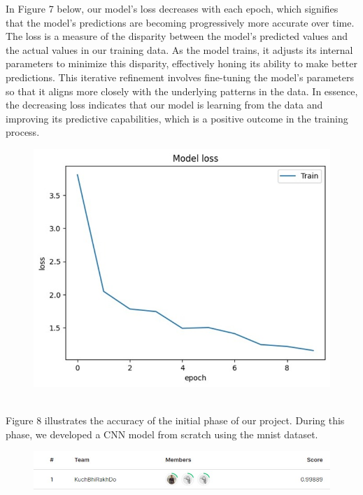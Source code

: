 \documentclass[12pt,a4paper]{article}
\begin{document}
\pagebreak 
In Figure 7 below, our model's loss decreases with each epoch, which signifies that the model's predictions are becoming progressively more accurate over time. The loss is a measure of the disparity between the model's predicted values and the actual values in our training data. As the model trains, it adjusts its internal parameters to minimize this disparity, effectively honing its ability to make better predictions. This iterative refinement involves fine-tuning the model's parameters so that it aligns more closely with the underlying patterns in the data. In essence, the decreasing loss indicates that our model is learning from the data and improving its predictive capabilities, which is a positive outcome in the training process.
\begin{figure}[h]
    \centering
    \includegraphics[width=\linewidth]{images/3.4.2.jpeg}
     
     
     \caption{}     \label{fig:my_label} 
    \end{figure}\\
\pagebreak
\linebreak
Figure 8 illustrates the accuracy of the initial phase of our project. During this phase, we developed a CNN model from scratch using the mnist dataset.

\begin{figure}[h]
    \centering
    
    \includegraphics[width=\linewidth]{images/Score.jpeg}
     
     
     \caption{}     \label{fig:my_label} 
    \end{figure}\\
\end{document}
